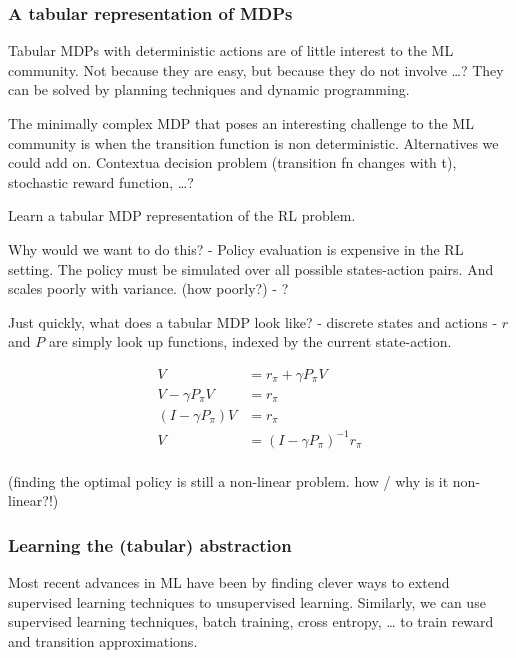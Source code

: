 \hypertarget{a-tabular-representation-of-mdps}{%
\subsubsection{A tabular representation of MDPs}\label{a-tabular-representation-of-mdps}}

Tabular MDPs with deterministic actions are of little interest to the ML
community. Not because they are easy, but because they do not involve
\ldots{}? They can be solved by planning techniques and dynamic
programming.

The minimally complex MDP that poses an interesting challenge to the ML
community is when the transition function is non deterministic.
Alternatives we could add on. Contextua decision problem (transition fn
changes with t), stochastic reward function, \ldots{}?

Learn a tabular MDP representation of the RL problem.

Why would we want to do this? - Policy evaluation is expensive in the RL
setting. The policy must be simulated over all possible states-action
pairs. And scales poorly with variance. (how poorly?) - ?

Just quickly, what does a tabular MDP look like? - discrete states and
actions - \(r\) and \(P\) are simply look up functions, indexed by the
current state-action.

\begin{align}
V &= r_{\pi} + \gamma P_{\pi} V \tag{bellman eqn}\\
V - \gamma P_{\pi} V &= r_{\pi}\\
(I-\gamma P_{\pi})V &= r_{\pi}\\
V &= (I-\gamma P_{\pi})^{-1}r_{\pi}\\
\end{align}

(finding the optimal policy is still a non-linear problem. how / why is
it non-linear?!)

\hypertarget{learning-the-tabular-abstraction}{%
\subsubsection{Learning the (tabular) abstraction}\label{learning-the-tabular-abstraction}}

Most recent advances in ML have been by finding clever ways to extend
supervised learning techniques to unsupervised learning. Similarly, we
can use supervised learning techniques, batch training, cross entropy,
\ldots{} to train reward and transition approximations.


